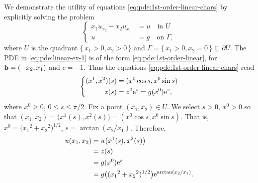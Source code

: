 \begin{example}
  We demonstrate the utility of equations
  \eqref{eq:pde:1st-order-linear-chars} by explicitly solving the problem
  \begin{equation}
    \label{eq:pde:linear-ex-1}
    \left\{
      \begin{aligned}
        x_1u_{x_2}-x_2u_{x_1}&=u\quad\text{in \(U\)}\\
        u&=g\quad\text{on \(\Gamma\)},
      \end{aligned}
    \right.
  \end{equation}
  where \(U\) is the quadrant \(\{\,x_1>0,x_2>0\,\}\) and
  \(\Gamma=\{\,x_1>0,x_2=0\,\}\subseteq\partial U\). The PDE in
  \eqref{eq:pde:linear-ex-1} is of the form
  \eqref{eq:pde:1st-order-linear}, for \(\mathbf{b}=(-x_2,x_1)\) and
  \(c=-1\). Thus the equations \eqref{eq:pde:1st-order-linear-chars} read
  \begin{equation}
    \label{eq:pde:linear-ex-1-chars}
    \left\{
      \begin{aligned}
        (x^1,x^2)(s)&=(x^0\cos s,x^0\sin s)\\
        z(s)&=z^0\mathrm{e}^s=g(x^0)\mathrm{e}^s,
      \end{aligned}
    \right.
  \end{equation}
  where \(x^0\geq 0\), \(0\leq s\leq \pi/2\). Fix a point \((x_1,x_2)\in
  U\). We select \(s>0\), \(x^0>0\) so that
  \((x_1,x_2)=\bigl(x^1(s),x^2(s)\bigr)=(x^0\cos s,x^0\sin s)\). That is,
  \(x^0=\bigl({x_1}^2+{x_2}^2\bigr)^{1/2}\),
  \(s=\arctan(x_2/x_1)\). Therefore,
  \begin{align*}
    u(x_1,x_2)
    &=u\bigl( x^1(s),x^2(s) \bigr)\\
    &=z(s)\\
    &=g(x^0)\mathrm{e}^s\\
    &=g\bigl(({x_1}^2+{x_2}^2)^{1/2}\bigr)\mathrm{e}^{\arctan(x_2/x_1)}.
  \end{align*}
\end{example}

